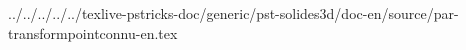 ../../../../../texlive-pstricks-doc/generic/pst-solides3d/doc-en/source/par-transformpointconnu-en.tex